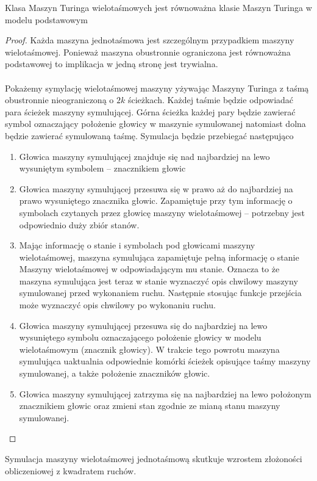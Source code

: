 \begin{tw}
	Klasa Maszyn Turinga wielotaśmowych jest równoważna klasie Maszyn Turinga w modelu podstawowym
	\begin{proof}
		Każda maszyna jednotaśmowa jest szczególnym przypadkiem maszyny wielotaśmowej. Ponieważ maszyna obustronnie
		ograniczona jest równoważna podstawowej to implikacja w jedną stronę jest trywialna.\\\\
		Pokażemy symylację wielotaśmowej maszyny yżywając Maszyny Turinga z taśmą obustronnie nieograniczoną o $2k$ 
		ścieżkach. Każdej taśmie będzie odpowiadać para ścieżek maszyny symulującej.
		Górna ścieżka każdej pary będzie zawierać symbol oznaczający położenie głowicy w maszynie symulowanej natomiast
		dolna będzie zawierać symulowaną taśmę.
		Symulacja będzie przebiegać następująco
		\begin{enumerate}
			\item Głowica maszyny symulującej znajduje się nad najbardziej na lewo wysuniętym symbolem -- znacznikiem głowic
			\item Głowica maszyny symulującej przesuwa się w prawo aż do najbardziej na prawo wysuniętego znacznika głowic.
			Zapamiętuje przy tym informację o symbolach czytanych przez głowicę maszyny wielotaśmowej -- 
			potrzebny jest odpowiednio duży zbiór stanów.
			\item Mając informację o stanie i symbolach pod głowicami maszyny wielotaśmowej, maszyna 
			symulująca zapamiętuje pełną informację o stanie Maszyny wielotaśmowej w odpowiadającym mu stanie.
			Oznacza to że maszyna symulująca jest teraz w stanie wyznaczyć opis chwilowy maszyny symulowanej 
			przed wykonaniem ruchu. Następnie stosując funkcje przejścia może wyznaczyć opis chwilowy po wykonaniu ruchu.
			\item Głowica maszyny symulującej przesuwa się do najbardziej na lewo wysuniętego symbolu oznaczającego położenie
			głowicy w modelu wielotaśmowym (znacznik głowicy). W trakcie tego powrotu maszyna symulująca uaktualnia odpowiednie
			komórki ścieżek opisujące taśmy maszyny symulowanej, a także położenie znaczników głowic.
			\item Głowica maszyny symulującej zatrzyma się na najbardziej na lewo położonym znacznikiem głowic 
			oraz zmieni stan zgodnie ze mianą stanu maszyny symulowanej.
		\end{enumerate}
	\end{proof}
	\begin{uwaga}
		Symulacja maszyny wielotaśmowej jednotaśmową skutkuje wzrostem złożoności obliczeniowej z kwadratem ruchów.
	\end{uwaga}
\end{tw}

